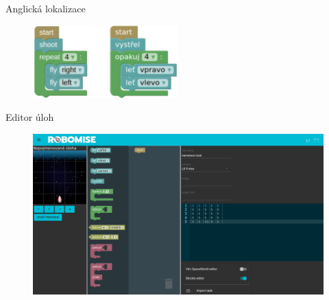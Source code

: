 \documentclass[
]{beamer}
\begin{document}
\begin{frame}{Anglická lokalizace}
\begin{figure}
\includegraphics[width=0.5\textwidth,height=.75\textheight,keepaspectratio]{../img/roboblocks-english-czech}
\end{figure}
\end{frame}

\begin{frame}{Editor úloh}
\begin{figure}
\includegraphics[width=\textwidth,height=.75\textheight,keepaspectratio]{../img/task-editor}
\end{figure}
\end{frame}
\end{document}
